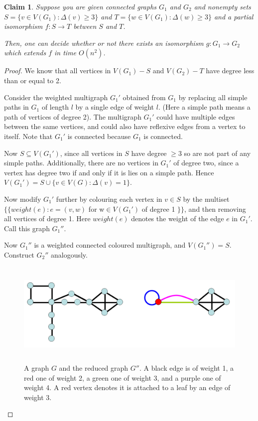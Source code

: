 \documentclass[11pt]{report}
\newtheorem{claim}{Claim}
\begin{document}
\begin{claim} Suppose you are given connected graphs $G_1$ and $G_2$ and nonempty sets $S=\{v\in V(G_1): \Delta(v)\geq3\}$ and $T=\{w\in V(G_1): \Delta(w)\geq3\}$ and a partial isomorphism $f:S \rightarrow T$ between $S$ and $T$.

Then, one can decide whether or not there exists an isomorphism $g:G_1 \rightarrow G_2$ which extends $f$ in time $O(n^2)$.
\label{mln_extend_iso_n2}
\end{claim}
\begin{proof}

We know that all vertices in $V(G_1)-S$ and $V(G_2)-T$ have degree less than or equal to 2. 

Consider the weighted multigraph $G_1'$ obtained from $G_1$ by replacing all simple paths in $G_1$ of length $l$ by a single edge of weight $l$. (Here a simple path means a path of vertices of degree 2). The multigraph $G_1'$ could have multiple edges between the same vertices, and could also have reflexive edges from a vertex to itself. Note that $G_1'$ is connected because $G_1$ is connected. 

Now $S \subseteq V(G_1')$, since all vertices in $S$ have degree $\geq3$ so are not part of any simple paths. Additionally, there are no vertices in $G_1'$ of degree two, since a vertex has degree two if and only if it is lies on a simple path. Hence $V(G_1') = S \cup \{v\in V(G) : \Delta(v)=1\}$.

Now modify $G_1'$ further by colouring each vertex in $v \in S$ by the multiset $\{\{ weight(e) : e=(v,w)$ for w$\in V(G_1')$ of degree 1  $\}\}$, and then removing all vertices of degree 1. Here $weight(e)$ denotes the weight of the edge $e$ in $G_1'$. Call this graph $G_1''$. 

Now $G_1''$ is a weighted connected coloured multigraph, and $V(G_1'')=S$. Construct $G_2''$ analogously. 

\begin{figure}[b!]
\begin{center}
\leavevmode
\includegraphics[height=50mm]{mln_reduction_v0.png}
\end{center}
\caption{A graph $G$ and the reduced graph $G''$. A black edge is of weight 1, a red one of weight 2, a green one of weight 3, and a purple one of weight 4. A red vertex denotes it is attached to a leaf by an edge of weight 3.}
\end{figure}


\end{proof}
\end{document}
